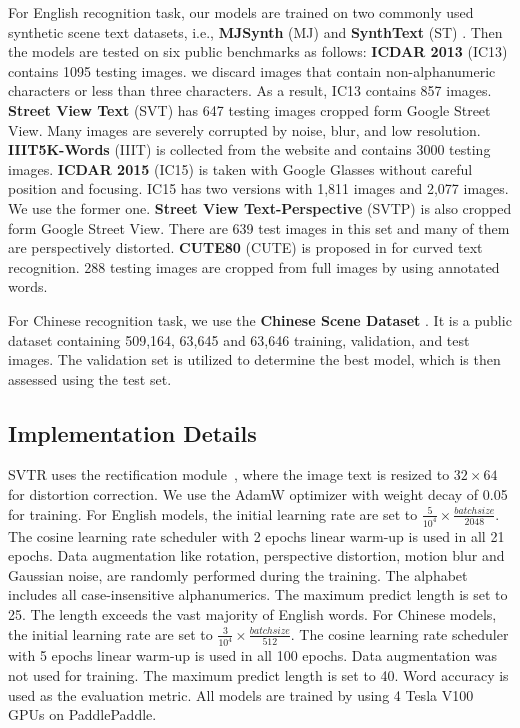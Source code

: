 \documentclass{article}
\begin{document}
For English recognition task, our models are trained on two commonly used synthetic scene text datasets, i.e., {\bf MJSynth} (MJ) \cite{jaderberg14synthetic,Jaderberg2015ReadingTI} and {\bf SynthText} (ST) \cite{Synthetic}. Then the models are tested on six public benchmarks as follows: {\bf ICDAR 2013} (IC13) \cite{icdar2013} contains 1095 testing images. we discard images that contain non-alphanumeric characters or less than three characters. As a result, IC13 contains 857 images. {\bf Street View Text} (SVT) \cite{Wang2011SVT} has 647 testing images cropped form Google Street View. Many images are severely corrupted by noise, blur, and low resolution. {\bf IIIT5K-Words} (IIIT) \cite{IIIT5K} is collected from the website and contains 3000 testing images. {\bf ICDAR 2015} (IC15) \cite{icdar2015} is taken with Google Glasses without careful position and focusing. IC15 has two versions with 1,811 images and 2,077 images. We use the former one. {\bf Street View Text-Perspective} (SVTP) \cite{SVTP} is also cropped form Google Street View. There are 639 test images in this set and many of them are perspectively distorted. {\bf CUTE80} (CUTE) is proposed in\cite{Risnumawan2014cute} for curved text recognition. 288 testing images are cropped from full images by using annotated words.

For Chinese recognition task, we use the {\bf Chinese Scene Dataset} \cite{chen2021benchmarking}. It is a public dataset containing 509,164, 63,645 and 63,646 training, validation, and test images. 
The validation set is utilized to determine the best model, which is then assessed using the test set.

\subsection{Implementation Details}

SVTR uses the rectification module~\cite{shi2019aster}, where the image text is resized to $32\times64$ for distortion correction.
We use the AdamW optimizer with weight decay of 0.05 for training. For English models, the initial learning rate are set to $\frac{5}{10^{4}} \times \frac{batchsize}{2048}$. The cosine learning rate scheduler with 2 epochs linear warm-up is used in all 21 epochs. Data augmentation like rotation, perspective distortion, motion blur and Gaussian noise, are randomly performed during the training. The alphabet includes all case-insensitive alphanumerics. The maximum predict length is set to 25. The length exceeds the vast majority of English words. For Chinese models, the initial learning rate are set to $\frac{3}{10^{4}} \times \frac{batchsize}{512}$. The cosine learning rate scheduler with 5 epochs linear warm-up is used in all 100 epochs. Data augmentation was not used for training. The maximum predict length is set to 40. Word accuracy is used as the evaluation metric. All models are trained by using 4 Tesla V100 GPUs on PaddlePaddle.
\end{document}
